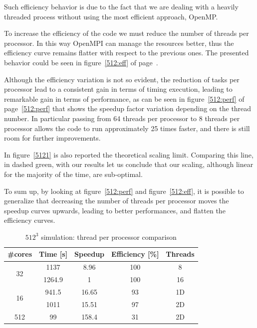 Such efficiency behavior is due to the fact that we are dealing with a heavily threaded process without using the most efficient approach, OpenMP. \\
\par
To increase the efficiency of the code we must reduce the number of threads per processor. In this way OpenMPI can manage the resources better, thus the efficiency curve remains flatter with respect to the previous ones. The presented behavior could be seen in figure~\ref{512:eff} of page~\pageref{512:eff}.
\par
Although the efficiency variation is not so evident, the reduction of tasks per processor lead to a consistent gain in terms of timing execution, leading to remarkable gain in terms of performance, as can be seen in figure~\ref{512:perf} of page~\ref{512:perf} that shows the speedup factor variation depending on the thread number. In particular passing from 64 threads per processor to 8 threads per processor allows the code to run approximately 25 times faster, and there is still room for further improvements.


In figure~\ref{5121} is also reported the theoretical scaling limit. Comparing this line, in dashed green, with our results let us conclude that our scaling, although linear for the majority of the time, are sub-optimal. 
\par
To sum up, by looking at figure~\ref{512:perf} and figure~\ref{512:eff}, it is possible to generalize that decreasing the number of threads per processor moves the speedup curves upwards, leading to better performances, and flatten the efficiency curves.


\begin{table}[h]
\caption{$512^{3}$ simulation: thread per processor comparison}
\begin{center}
\begin{tabular}{c c c c c}
\toprule
\textbf{\#cores} & \textbf{Time [s]} & \textbf{Speedup} & \textbf{Efficiency [\%]} & \textbf{Threads}\\
\midrule
\multirow{2}{*}{32} & 1137 & 8.96 & 100 &8\\
& 1264.9 & 1 & 100 & 16\\
\hline
\multirow{2}{*}{16} & 941.5 & 16.65 & 93 & 1D\\
& 1011 & 15.51 & 97 & 2D\\
\hline
512 & 99 & 158.4 & 31 & 2D\\
\bottomrule
\end{tabular}
\end{center}
\label{512data:multi}
\end{table}




